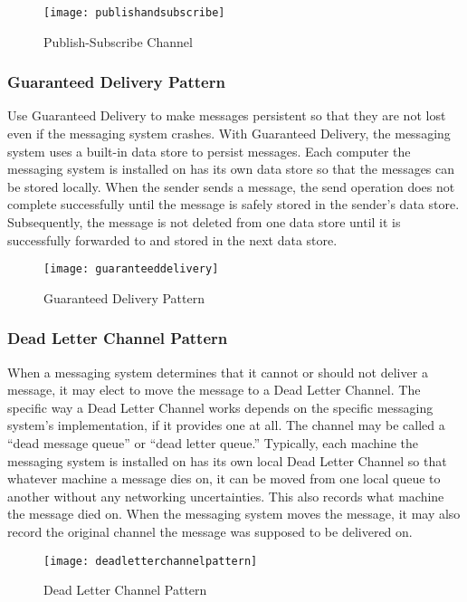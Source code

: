 \begin{figure}[H]
  \center
  \texttt{[image: publishandsubscribe]}
  \caption{Publish-Subscribe Channel}
\end{figure}

\subsubsection{Guaranteed Delivery Pattern}
Use Guaranteed Delivery to make messages persistent so that they are not lost even if the messaging system crashes.  With Guaranteed Delivery, the messaging system uses a built-in data store to persist messages. Each computer the messaging system is installed on has its own data store so that the messages can be stored locally. When the sender sends a message, the send operation does not complete successfully until the message is safely stored in the sender’s data store. Subsequently, the message is not deleted from one data store until it is successfully forwarded to and stored in the next data store.

\begin{figure}[H]
  \center
  \texttt{[image: guaranteeddelivery]}
  \caption{Guaranteed Delivery Pattern}
\end{figure}

\subsubsection{Dead Letter Channel Pattern}
When a messaging system determines that it cannot or should not deliver a message, it may elect to move the message to a Dead Letter Channel. The specific way a Dead Letter Channel works depends on the specific messaging system’s implementation, if it provides one at all. The channel may be called a “dead message queue” or “dead letter queue.” Typically, each machine the messaging system is installed on has its own local Dead Letter Channel so that whatever machine a message dies on, it can be moved from one local queue to another without any networking uncertainties. This also records what machine the message died on. When the messaging system moves the message, it may also record the original channel the message was supposed to be delivered on.

\begin{figure}[H]
  \center
  \texttt{[image: deadletterchannelpattern]}
  \caption{Dead Letter Channel Pattern}
\end{figure}

